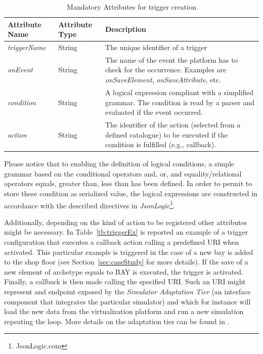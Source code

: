 \begin{table}[h]
\begin{tabular}{@{}l|l|p{65mm}@{}}
\toprule
\textbf{Attribute Name} & \textbf{Attribute Type} & \textbf{Description} \\ \midrule
 \textit{triggerName}   & String & The unique identifier of a trigger \\
 \textit{onEvent}       & String & The name of the event the platform has to check for the occurrence. Examples are \textit{onSaveElement}, \textit{onSaveAttribute}, etc.            \\
 \textit{condition}          & String & A logical expression compliant with a simplified grammar. The condition is read by a parser and evaluated if the event occurred.\\ 
 \textit{action}                     &  String              & The identifier of the action (selected from a defined catalogue) to be executed if the condition is fulfilled (e.g., callback).       \\ \bottomrule
\end{tabular}%
\caption{Mandatory Attributes for trigger creation}
\label{tb:trigger}
\end{table}

Please notice that to enabling the definition of logical conditions, a simple grammar based on the conditional operators and, or, and equality/relational operators equals, greater than, less than has been defined. In order to permit to store these condition as serialized value, the logical expressions are constructed in accordance with the described directives in \textit{JsonLogic}\footnote{JsonLogic.com}.


Additionally, depending on the kind of action to be registered other attributes might be necessary. In Table~\ref{tb:triggerEx} is reported an example of a trigger configuration that executes a callback action calling a predefined URI when activated. This particular example is triggered in the case of a new bay is added to the shop floor (see Section~\ref{sec:caseStudy} for more details). If the save of a new element of archetype equals to BAY is executed, the trigger is activated. Finally, a callback is then made calling the specified URI. Such an URI might represent and endpoint exposed by the \textit{Simulator Adaptation Tier} (an interface component that integrates the particular simulator) and which for instance will load the new data from the virtualization platform and run a new simulation repeating the loop. More details on the adaptation tier can be found in \cite{FAR-EDGE45}.

